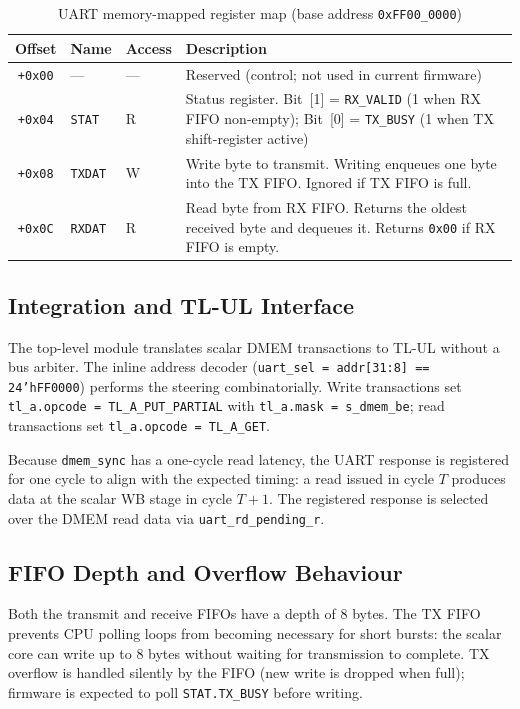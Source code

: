 \begin{table}[H]
\centering
\caption{UART memory-mapped register map (base address \texttt{0xFF00\_0000})}
\label{tab:uart_regs}
\begin{tabular}{cllp{6.5cm}}
\toprule
\textbf{Offset} & \textbf{Name} & \textbf{Access} & \textbf{Description} \\
\midrule
\texttt{+0x00} & --- & --- & Reserved (control; not used in current firmware) \\
\texttt{+0x04} & \texttt{STAT}  & R & Status register.
  Bit~[1] = \texttt{RX\_VALID} (1 when RX FIFO non-empty);
  Bit~[0] = \texttt{TX\_BUSY} (1 when TX shift-register active) \\
\texttt{+0x08} & \texttt{TXDAT} & W & Write byte to transmit.
  Writing enqueues one byte into the TX FIFO.
  Ignored if TX FIFO is full. \\
\texttt{+0x0C} & \texttt{RXDAT} & R & Read byte from RX FIFO.
  Returns the oldest received byte and dequeues it.
  Returns \texttt{0x00} if RX FIFO is empty. \\
\bottomrule
\end{tabular}
\end{table}

\subsection{Integration and TL-UL Interface}

The top-level module translates scalar DMEM transactions to TL-UL without a bus
arbiter. The inline address decoder (\texttt{uart\_sel = addr[31:8] == 24'hFF0000})
performs the steering combinatorially. Write transactions set
\texttt{tl\_a.opcode = TL\_A\_PUT\_PARTIAL} with \texttt{tl\_a.mask = s\_dmem\_be};
read transactions set \texttt{tl\_a.opcode = TL\_A\_GET}.

Because \texttt{dmem\_sync} has a one-cycle read latency, the UART response is
registered for one cycle to align with the expected timing: a read issued in cycle $T$
produces data at the scalar WB stage in cycle $T+1$. The registered response is
selected over the DMEM read data via \texttt{uart\_rd\_pending\_r}.

\subsection{FIFO Depth and Overflow Behaviour}

Both the transmit and receive FIFOs have a depth of 8 bytes. The TX FIFO prevents
CPU polling loops from becoming necessary for short bursts: the scalar core can write
up to 8 bytes without waiting for transmission to complete. TX overflow is handled
silently by the FIFO (new write is dropped when full); firmware is expected to poll
\texttt{STAT.TX\_BUSY} before writing.

